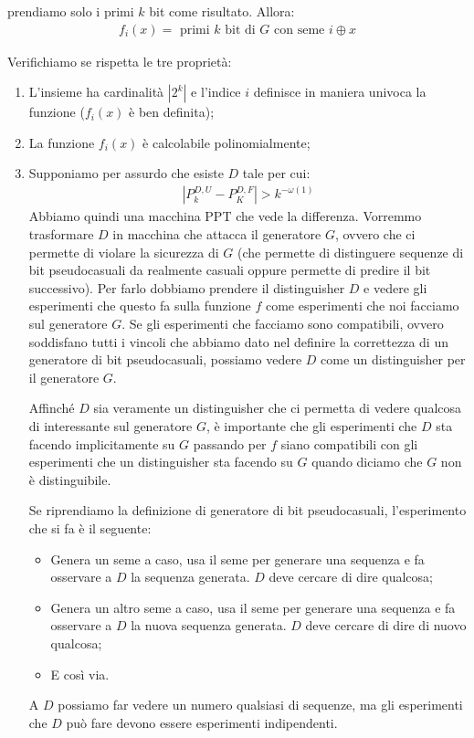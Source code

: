 \noindent prendiamo solo i primi $k$ bit come risultato. Allora:
\begin{align*}
    f_i(x) = \text{ primi $k$ bit di $G$ con seme $i \oplus x$}
\end{align*}

\noindent Verifichiamo se rispetta le tre proprietà:
\begin{enumerate}
    \item L'insieme ha cardinalità $|2^k|$ e l'indice $i$ definisce in maniera univoca la funzione ($f_i(x)$ è ben definita);
    \item La funzione $f_i(x)$ è calcolabile polinomialmente;
    \item Supponiamo per assurdo che esiste $D$ tale per cui:
    \begin{align*}
            \left| P_k^{D, U} - P_K^{D, F} \right| > k^{-\omega(1)}
        \end{align*}
    Abbiamo quindi una macchina PPT che vede la differenza. Vorremmo trasformare $D$ in macchina che attacca il generatore $G$, ovvero che ci permette di violare la sicurezza di $G$ (che permette di distinguere sequenze di bit pseudocasuali da realmente casuali oppure permette di predire il bit successivo). 
    Per farlo dobbiamo prendere il distinguisher $D$ e vedere gli esperimenti che questo fa sulla funzione $f$ come esperimenti che noi facciamo sul generatore $G$. Se gli esperimenti che facciamo sono compatibili, ovvero soddisfano tutti i vincoli che abbiamo dato nel definire la correttezza di un generatore di bit pseudocasuali, possiamo vedere $D$ come un distinguisher per il generatore $G$.

    Affinché $D$ sia veramente un distinguisher che ci permetta di vedere qualcosa di interessante sul generatore $G$, è importante che gli esperimenti che $D$ sta facendo implicitamente su $G$ passando per $f$ siano compatibili con gli esperimenti che un distinguisher sta facendo su $G$ quando diciamo che $G$ non è distinguibile.

    Se riprendiamo la definizione di generatore di bit pseudocasuali, l'esperimento che si fa è il seguente: 
    \begin{itemize}
        \item Genera un seme a caso, usa il seme per generare una sequenza e fa osservare a $D$ la sequenza generata. $D$ deve cercare di dire qualcosa;
        \item Genera un altro seme a caso, usa il seme per generare una sequenza e fa osservare a $D$ la nuova sequenza generata. $D$ deve cercare di dire di nuovo qualcosa;
        \item E così via.
    \end{itemize}
    A $D$ possiamo far vedere un numero qualsiasi di sequenze, ma gli esperimenti che $D$ può fare devono essere esperimenti indipendenti. 
    

\end{enumerate}
